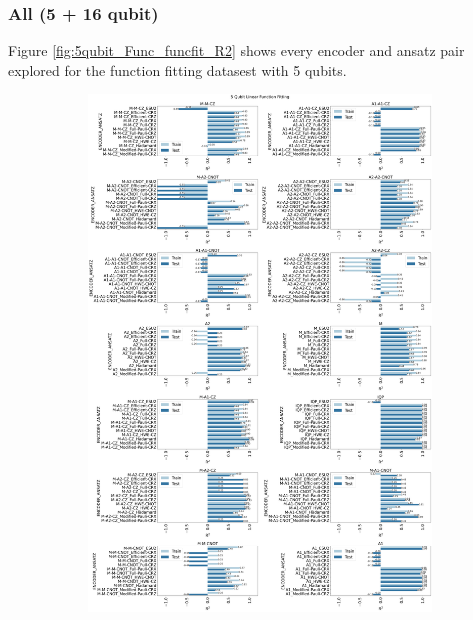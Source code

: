 \documentclass[journal=jacsat,manuscript=article]{achemso}
\begin{document}
\subsubsection{All (5 + 16 qubit)}
Figure \ref{fig:5qubit_Func_funcfit_R2} shows every encoder and ansatz pair explored for the function fitting datasest with 5 qubits.
\begin{figure}[H]
	\centering
	\begin{subfigure}[b]{\textwidth}
		\centering
		\includegraphics[width=\textwidth]{images/Function_Fitting/5qubit_Linear_funcfit_R2.png}
		\caption{}
		\label{fig:5qubit_Linear_funcfit_R2}
	\end{subfigure}
	\hfill
	\begin{subfigure}[b]{\textwidth}
		\centering

\end{subfigure}
\end{figure}
\end{document}
